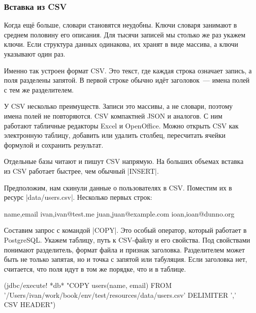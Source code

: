 \subsubsection*{Вставка из CSV}


Когда ещё больше, словари становятся неудобны. Ключи словаря занимают в
среднем половину его описания. Для тысячи записей мы столько же раз укажем
ключи. Если структура данных одинакова, их хранят в виде массива, а ключи
указывают один раз.

Именно так устроен формат CSV.
Это текст, где каждая строка означает запись, а поля разделены запятой.
В первой строке обычно идёт заголовок~--- имена полей с тем же разделителем.

У CSV несколько преимуществ. Записи это массивы, а не словари, поэтому имена
полей не повторяются. CSV компактней JSON и аналогов. С ним работают табличные
редакторы Excel и OpenOffice. Можно открыть CSV как электронную таблицу,
добавить или удалить столбец, пересчитать ячейки формулой и сохранить результат.


Отдельные базы читают и пишут CSV напрямую. На больших объемах вставка из CSV
работает быстрее, чем обычный \spverb|INSERT|.

Предположим, нам скинули данные о пользователях в CSV. Поместим их в ресурс
\spverb|data/users.csv|. Несколько первых строк:

\begin{english}
  \begin{text}
name,email
ivan,ivan@test.me
juan,juan@example.com
ioan,ioan@dunno.org
  \end{text}
\end{english}


Составим запрос с командой \spverb|COPY|. Это особый оператор, который работает
в PostgreSQL. Укажем таблицу, путь к CSV-файлу и его свойства. Под свойствами
понимают разделитель, формат файла и признак заголовка. Разделителем может быть
не только запятая, но и точка с запятой или табуляция. Если заголовка нет,
считается, что поля идут в том же порядке, что и в таблице.

\begin{english}
  \begin{clojure}
(jdbc/execute! *db*
 "COPY users(name, email)
  FROM '/Users/ivan/work/book/env/test/resources/data/users.csv'
  DELIMITER ',' CSV HEADER")
  \end{clojure}
\end{english}

